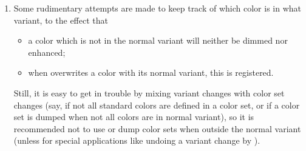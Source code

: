 \documentclass[12pt]{scrartcl}
\let\newslide=\relax
\begin{document}
\begin{enumerate}
    \newslide

    Hence, it is recommended to
    \begin{itemize}
    \item restrict the  of a global variant switching command like ,
       or  by enlcosing it into a \LaTeX{} group (like \code{\{\dots\}}) or
    \item use  before the command to save the current definitions of all colors, to be restored
      with .

      At the very beginning of a  command, \TeX Power executes ,
      so you can restore the colors anywhere in the argument of  by saying
      .
    \end{itemize}

    \newslide

  \item Some rudimentary attempts are made to keep track of which color is in what variant, to the effect that
    \begin{itemize}
    \item a color which is not in the normal variant will neither be dimmed nor enhanced;
    \item when  overwrites a color with its normal variant, this is registered.
    \end{itemize}
    Still, it is easy to get in trouble by mixing variant changes with color set changes (say, if not all standard
    colors are defined in a color set, or if a color set is dumped when not all colors are in normal variant), so it is
    recommended not to use or dump color sets when outside the normal variant (unless for special applications like
    undoing a variant change by ).
  \end{enumerate}


    \newslide
\end{document}
